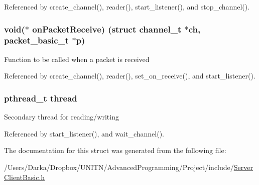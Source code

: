 Referenced by create\+\_\+channel(), reader(), start\+\_\+listener(), and stop\+\_\+channel().

\subsubsection[{\texorpdfstring{on\+Packet\+Receive}{onPacketReceive}}]{\setlength{\rightskip}{0pt plus 5cm}void($\ast$ on\+Packet\+Receive) (struct {\bf channel\+\_\+t} $\ast$ch, {\bf packet\+\_\+basic\+\_\+t} $\ast$p)}\hypertarget{structchannel__t_ae391524520adf65e91f52efaffb033a5}{}\label{structchannel__t_ae391524520adf65e91f52efaffb033a5}
Function to be called when a packet is received 

Referenced by create\+\_\+channel(), reader(), set\+\_\+on\+\_\+receive(), and start\+\_\+listener().

\subsubsection[{\texorpdfstring{thread}{thread}}]{\setlength{\rightskip}{0pt plus 5cm}pthread\+\_\+t thread}\hypertarget{structchannel__t_a01f75a9ad916f63a94e06a27635ba278}{}\label{structchannel__t_a01f75a9ad916f63a94e06a27635ba278}
Secondary thread for reading/writing 

Referenced by start\+\_\+listener(), and wait\+\_\+channel().



The documentation for this struct was generated from the following file\+:\begin{DoxyCompactItemize}
\item 
/\+Users/\+Darka/\+Dropbox/\+U\+N\+I\+T\+N/\+Advanced\+Programming/\+Project/include/\hyperlink{_server_client_basic_8h}{Server\+Client\+Basic.\+h}\end{DoxyCompactItemize}
